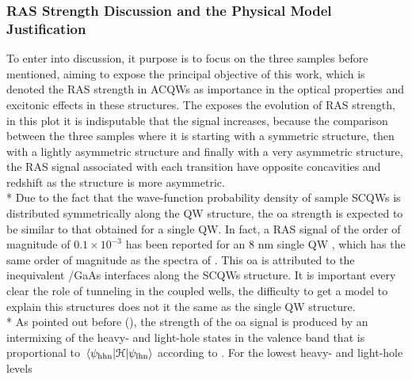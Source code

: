 \subsubsection{RAS Strength Discussion and the Physical Model Justification}
\label{subsubsec:chapter-3-ras-discussed}
\vspace{-10mm}
To enter into discussion, it purpose is to focus on the three samples before mentioned, aiming to expose the principal objective of this work, which is denoted the \gls{RAS} strength in \gls{ACQWs} as importance in the  optical properties and excitonic effects in these structures. The  exposes the evolution of \gls{RAS} strength, in this plot it is indisputable that the signal increases, because the comparison between the three samples where it is starting with a symmetric structure, then with a lightly asymmetric structure and finally with a very asymmetric structure, the \gls{RAS} signal associated with each transition have opposite concavities and redshift as the structure is more asymmetric. \\*
Due to the fact that the wave-function probability density of sample \gls{SCQWs} is distributed symmetrically along the 
\gls{QW}
structure, the \gls{oa} strength is expected to be similar to that
obtained for a single \gls{QW}. In fact, a \gls{RAS} signal of the order of magnitude of $0.1\times 10^{-3}$ has been reported for an 8 nm single \gls{QW} \cite{chen2002interface}, which has the same order of magnitude as the spectra of . This \gls{oa} is attributed to the inequivalent \algaas/GaAs interfaces along the \gls{SCQWs}
structure. It is important every clear the role of tunneling in the coupled wells, the difficulty to get a model to explain this structures  does not it the same as the single \gls{QW} structure.  \\*
As pointed out before (), the strength of the \gls{oa} signal is produced by an intermixing of the heavy- and light-hole states in the valence band that is proportional to  $\mel{\psi_{\mathrm{hhn}}}{\cal{H}}{\psi_{\mathrm{lhn}}}$ according to . For the lowest heavy- and light-hole levels
